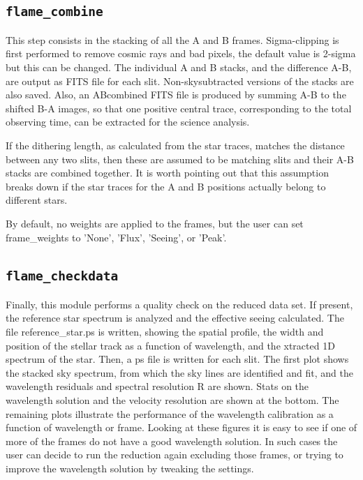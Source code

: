 \documentclass[a4paper]{article}
\begin{document}
\subsection{\texttt{flame\_combine}}

This step consists in the stacking of all the A and B frames. Sigma-clipping is first performed to remove cosmic rays and bad pixels, the default value is 2-sigma but this can be changed. The individual A and B stacks, and the difference A-B, are output as FITS file for each slit. Non-skysubtracted versions of the stacks are also saved. Also, an ABcombined FITS file is produced by summing A-B to the shifted B-A images, so that one positive central trace, corresponding to the total observing time, can be extracted for the science analysis.

If the dithering length, as calculated from the star traces, matches the distance between any two slits, then these are assumed to be matching slits and their A-B stacks are combined together. It is worth pointing out that this assumption breaks down if the star traces for the A and B positions actually belong to different stars.

By default, no weights are applied to the frames, but the user can set frame\_weights to 'None', 'Flux', 'Seeing', or 'Peak'.


\subsection{\texttt{flame\_checkdata}}

Finally, this module performs a quality check on the reduced data set. If present, the reference star spectrum is analyzed and the effective seeing calculated. The file reference\_star.ps is written, showing the spatial profile, the width and position of the stellar track as a function of wavelength, and the xtracted 1D spectrum of the star. Then, a ps file is written for each slit. The first plot shows the stacked sky spectrum, from which the sky lines are identified and fit, and the wavelength residuals and spectral resolution R are shown. Stats on the wavelength solution and the velocity resolution are shown at the bottom. The remaining plots illustrate the performance of the wavelength calibration as a function of wavelength or frame. Looking at these figures it is easy to see if one of more of the frames do not have a good wavelength solution. In such cases the user can decide to run the reduction again excluding those frames, or trying to improve the wavelength solution by tweaking the settings.
\end{document}
